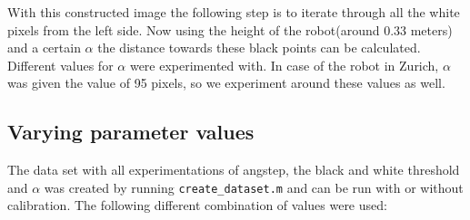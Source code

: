 \documentclass[a4paper, 20pt]{article}
\begin{document}
\begin{figure}[!ht]
\centering
\begin{floatrow}
  
\end{floatrow}
\end{figure}

With this constructed image the following step is to iterate through all the
white pixels from the left side.  Now using
the height of the robot(around 0.33 meters) and a certain $\alpha$ the distance towards these
black points can be calculated.
Different values for $\alpha$ were experimented with. In case of the robot in
Zurich, $\alpha$ was given the value of 95 pixels, so we experiment around these
values as well.

\subsection{Varying parameter values}
The data set with all experimentations of angstep, the black and white
threshold and  $\alpha$ was created by running \texttt{create\_dataset.m} and can be run with
or without calibration. The following different combination of values were
used:\\
\end{document}
